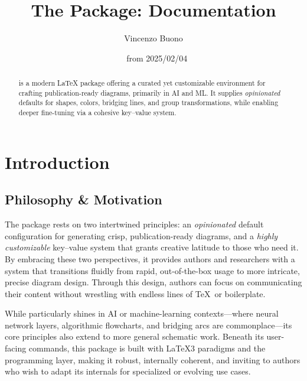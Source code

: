 \documentclass[show-experimental]{l3doc}
\title{The \pkg{neural-sketch} Package: Documentation}
\author{Vincenzo Buono}
\date{\fileversion~ from 2025/02/04}
\begin{document}
\maketitle
\tableofcontents

\begin{abstract}
	\noindent
	 is a modern \LaTeX{} package offering
	a curated yet customizable environment for crafting publication-ready
	diagrams, primarily in AI and ML. It supplies
	\emph{opinionated} defaults for shapes, colors, bridging lines, and
	group transformations, while enabling deeper fine-tuning via a cohesive
	key--value system.
\end{abstract}


\section{Introduction}

\subsection{Philosophy \& Motivation}

The  package rests on two intertwined principles: an \emph{opinionated} default configuration for generating crisp, publication-ready diagrams, and a \emph{highly customizable} key–value system that grants creative latitude to those who need it. By embracing these two perspectives, it provides authors and researchers with a system that transitions fluidly from rapid, out-of-the-box usage to more intricate, precise diagram design. Through this design, authors can focus on communicating their content without wrestling with endless lines of \TeX\ or  boilerplate.


While  particularly shines in AI or machine-learning contexts—where neural network layers, algorithmic flowcharts, and bridging arcs are commonplace—its core principles also extend to more general schematic work. Beneath its user-facing commands, this package is built with \LaTeX3 paradigms and the  programming layer, making it robust, internally coherent, and inviting to authors who wish to adapt its internals for specialized or evolving use cases.
\end{document}
